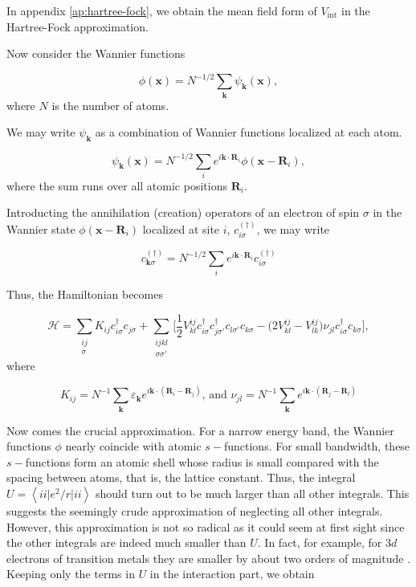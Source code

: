 In appendix \ref{ap:hartree-fock}, we obtain the mean field form of $V_{\text{int}}$ in the Hartree-Fock approximation.

Now consider the Wannier functions

\begin{equation}
\phi(\bm x) = N^{-1/2} \sum_{\bm k} \psi_{\bm k} (\bm x) , 
\end{equation}
where $N$ is the number of atoms.

We may write $\psi_{\bm k}$ as a combination of Wannier functions localized at each atom.

\begin{equation}
\psi_{\bm k} (\bm x) = N^{-1/2} \sum_i e^{i \bm k \cdot \bm R_i} \phi (\bm x - \bm R_i) ,
\end{equation}
where the sum runs over all atomic positions $\bm R_i$. 

Introducting the annihilation (creation) operators of an electron of spin $\sigma$ in the Wannier state $\phi (\bm x - \bm R_i)$ localized at site $i$, $c_{i\sigma}^{(\dagger)}$, we may write

\begin{equation}
c_{\bm k \sigma}^{(\dagger)} = N^{-1/2} \sum_i e^{i \bm k \cdot \bm R_i} c_{i\sigma}^{(\dagger)}
\end{equation}

Thus, the Hamiltonian becomes 

\begin{equation}
\mathcal{H} = \sum_{\substack{ i j \\ \sigma} } K_{ij} c_{i \sigma}^\dagger c_{j \sigma} + \sum_{\substack{i j k l \\ \sigma \sigma'} } \bigg[  \frac{1}{2} V^{i j}_{k l}
 c_{i \sigma}^\dagger c_{j \sigma'}^\dagger c_{l \sigma'} c_{ k \sigma} - \bigg( 2 V^{i j}_{k l} - V^{i j} _{l k} \bigg) \nu_{j l} c_{i \sigma}^\dagger c_{ k \sigma} \bigg]  ,
\end{equation}
where

\begin{equation}\label{eq:hopping_matrix}
K_{ij} = N^{-1} \sum_{\bm k} \varepsilon_{\bm k} e^{i \bm k \cdot ( \bm R_i - \bm R_j )}, \, \text{and} \, \, \nu_{j l} = N^{-1} \sum_{\bm k} e^{i \bm k \cdot ( \bm R_j - \bm R_l) }
\end{equation}

Now comes the crucial approximation.
For a narrow energy band, the Wannier functions $\phi$ nearly coincide with atomic $s-$functions.
For small bandwidth, these $s-$functions form an atomic shell whose radius is small compared with the spacing between atoms, that is, the lattice constant.
Thus, the integral $U = \left\langle i i \big| e^2 / r \big| i i \right\rangle$ should turn out to be much larger than all other integrals.
This suggests the seemingly crude approximation of neglecting all other integrals.
However, this approximation is not so radical as it could seem at first sight since the other integrals are indeed much smaller than $U$.
In fact, for example, for $3d$ electrons of transition metals they are smaller by about two orders of magnitude \cite{hubbard_electron_1963}.
Keeping only the terms in $U$ in the interaction part, we obtain

